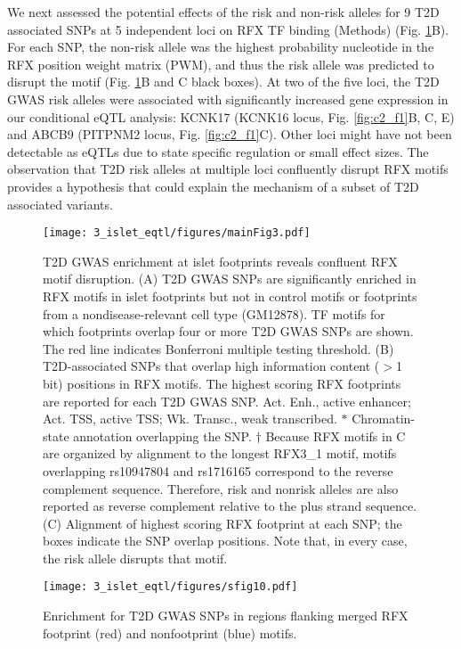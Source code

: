 We next assessed the potential effects of the risk and non-risk alleles for 9 T2D associated SNPs at 5 independent loci on RFX TF binding (Methods) (Fig. \ref{fig:c2_f3}B). For each SNP, the non-risk allele was the highest probability nucleotide in the RFX position weight matrix (PWM), and thus the risk allele was predicted to disrupt the motif (Fig. \ref{fig:c2_f3}B and C black boxes). At two of the five loci, the T2D GWAS risk alleles were associated with significantly increased gene expression in our conditional eQTL analysis: KCNK17 (KCNK16 locus, Fig. \ref{fig:c2_f1}B, C, E) and ABCB9 (PITPNM2 locus, Fig. \ref{fig:c2_f1}C). Other loci might have not been detectable as eQTLs due to state specific regulation or small effect sizes. The observation that T2D risk alleles at multiple loci confluently disrupt RFX motifs provides a hypothesis that could explain the mechanism of a subset of T2D associated variants.

\begin{figure}
    \centering
    \texttt{[image: 3\_islet\_eqtl/figures/mainFig3.pdf]}
    \caption{T2D GWAS enrichment at islet footprints reveals confluent RFX motif disruption. (A) T2D GWAS SNPs are significantly enriched in RFX motifs in islet footprints but not in control motifs or footprints from a nondisease-relevant cell type (GM12878). TF motifs for which footprints overlap four or more T2D GWAS SNPs are shown. The red line indicates Bonferroni multiple testing threshold. (B) T2D-associated SNPs that overlap high information content ($>$1 bit) positions in RFX motifs. The highest scoring RFX footprints are reported for each T2D GWAS SNP. Act. Enh., active enhancer; Act. TSS, active TSS; Wk. Transc., weak transcribed. $\ast$ Chromatin-state annotation overlapping the SNP. $\dagger$ Because RFX motifs in C are organized by alignment to the longest RFX3\_1 motif, motifs overlapping rs10947804 and rs1716165 correspond to the reverse complement sequence. Therefore, risk and nonrisk alleles are also reported as reverse complement relative to the plus strand sequence. (C) Alignment of highest scoring RFX footprint at each SNP; the boxes indicate the SNP overlap positions. Note that, in every case, the risk allele disrupts that motif.}
    \label{fig:c2_f3}
\end{figure}

\begin{figure}
    \centering
    \texttt{[image: 3\_islet\_eqtl/figures/sfig10.pdf]}
    \caption{Enrichment for T2D GWAS SNPs in regions flanking merged RFX footprint (red) and nonfootprint (blue) motifs.}
    \label{fig:c2_sf10}
  \end{figure}
  
